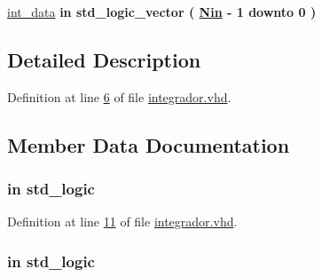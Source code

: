 \begin{DoxyCompactItemize}
\item 
\hyperlink{classintegrador_aec192442094491f2207942b96b64835c}{int\+\_\+data}  {\bfseries {\bfseries \textcolor{keywordflow}{in}\textcolor{vhdlchar}{ }}} {\bfseries \textcolor{comment}{std\+\_\+logic\+\_\+vector}\textcolor{vhdlchar}{ }\textcolor{vhdlchar}{(}\textcolor{vhdlchar}{ }\textcolor{vhdlchar}{ }\textcolor{vhdlchar}{ }\textcolor{vhdlchar}{ }{\bfseries \hyperlink{classintegrador_a2629ecb3bb37e8104b2866b0fd0c8574}{Nin}} \textcolor{vhdlchar}{-\/}\textcolor{vhdlchar}{ } \textcolor{vhdldigit}{1} \textcolor{vhdlchar}{ }\textcolor{keywordflow}{downto}\textcolor{vhdlchar}{ }\textcolor{vhdlchar}{ } \textcolor{vhdldigit}{0} \textcolor{vhdlchar}{ }\textcolor{vhdlchar}{)}\textcolor{vhdlchar}{ }} 
\end{DoxyCompactItemize}


\subsection{Detailed Description}


Definition at line \hyperlink{integrador_8vhd_source_l00006}{6} of file \hyperlink{integrador_8vhd_source}{integrador.\+vhd}.



\subsection{Member Data Documentation}
\hypertarget{classintegrador_a4a4609c199d30b3adebbeb3a01276ec5}{}
\subsubsection[{clk}]{ {\bfseries \textcolor{keywordflow}{in}\textcolor{vhdlchar}{ }} {\bfseries \textcolor{comment}{std\+\_\+logic}\textcolor{vhdlchar}{ }} \hspace{0.3cm}{\ttfamily [Port]}}\label{classintegrador_a4a4609c199d30b3adebbeb3a01276ec5}


Definition at line \hyperlink{integrador_8vhd_source_l00011}{11} of file \hyperlink{integrador_8vhd_source}{integrador.\+vhd}.

\hypertarget{classintegrador_adcf9c6f5161d039addbda5819bee64a3}{}
\subsubsection[{en}]{ {\bfseries \textcolor{keywordflow}{in}\textcolor{vhdlchar}{ }} {\bfseries \textcolor{comment}{std\+\_\+logic}\textcolor{vhdlchar}{ }} \hspace{0.3cm}{\ttfamily [Port]}}\label{classintegrador_adcf9c6f5161d039addbda5819bee64a3}


